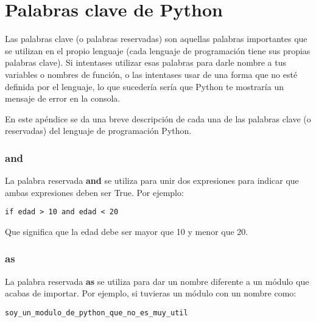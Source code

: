 
\chapter{Palabras clave de Python}\label{app:pythonkeywords}

Las palabras clave (o palabras reservadas) son aquellas palabras importantes que se utilizan en el propio lenguaje (cada lenguaje de programación tiene sus propias palabras clave). Si intentases utilizar esas palabras para darle nombre a tus variables o nombres de función, o las intentases usar de una forma que no esté definida por el lenguaje, lo que sucedería sería que Python te mostraría un mensaje de error en la consola. 

En este apéndice se da una breve descripción de cada una de las palabras clave (o reservadas) del lenguaje de programación Python.

\subsection*{and}

La palabra reservada \textbf{and} se utiliza para unir dos expresiones para indicar que ambas expresiones deben ser True. Por ejemplo:

\begin{listingignore}
\begin{verbatim}
if edad > 10 and edad < 20
\end{verbatim}
\end{listingignore}

\noindent
Que significa que la edad debe ser mayor que 10 y menor que 20.

\subsection*{as}

La palabra reservada \textbf{as} se utiliza para dar un nombre diferente a un módulo que acabas de importar. Por ejemplo, si tuvieras un módulo con un nombre como:

\begin{listingignore}
\begin{verbatim}
soy_un_modulo_de_python_que_no_es_muy_util
\end{verbatim}
\end{listingignore}

